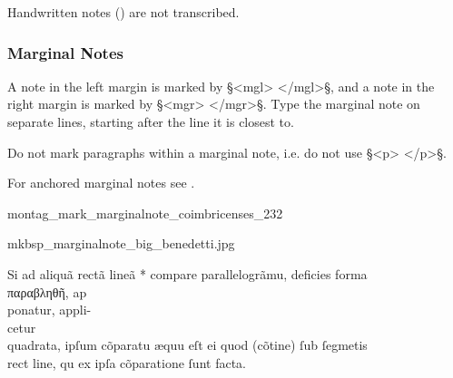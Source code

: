 \begin{note}
Handwritten notes () are not transcribed.
\end{note}

\subsubsection{Marginal Notes}
\label{section marginal notes}

\begin{mainrule}
A note in the left margin is marked by §<mgl> </mgl>§, and a note in the right margin is marked by §<mgr> </mgr>§. Type the marginal note on separate lines, starting after the line it is closest to.
\end{mainrule}

\begin{clarification}
Do not mark paragraphs within a marginal note, i.e. do not use §<p> </p>§.
\end{clarification}

\begin{crossref}
For anchored marginal notes see .
\end{crossref}

\vspace{2mm}
\begin{sampleImage}{montag_mark_marginalnote_coimbricenses_232}

\notTranscribed

\vspace{2mm}
\end{sampleImage}

\begin{sampleImage}{mkbsp_marginalnote_big_benedetti.jpg}

\begin{typeLatin}
Si ad aliquã rectã lineã * compare parallelogrãm\bs\tld{}u, defici\bs\tld{}es forma\\
παραβληθῆ, \bold{_}ap\bold{_} \\
\bold{_}ponatur, appli-\bold{_} \\
\bold{_}cetur\\
quadrata, ipſum cõparat\bs\tld{}u æqu\bs\tld{}u eſt ei quod (cõtine) ſub ſegm\bs\tld{}etis\\
rect line, qu ex ipſa cõparatione ſunt facta.
\end{typeLatin}
\end{sampleImage}


